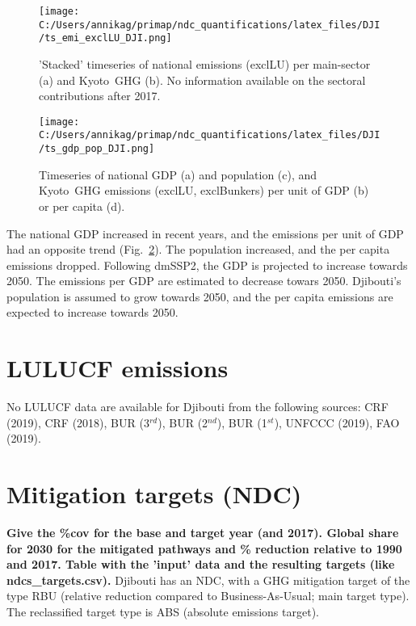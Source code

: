 \documentclass[12pt]{article}
\begin{document}
 \begin{figure}[H]
 \centering
 \texttt{[image: C:/Users/annikag/primap/ndc\_quantifications/latex\_files/DJI/ts\_emi\_exclLU\_DJI.png]}
 \caption{'Stacked' timeseries of national emissions (exclLU) per main-sector (a) and Kyoto~GHG (b). 
 No information available on the sectoral contributions after 2017.}
 \label{fig:tsEmi}
 \end{figure}

 \begin{figure}[H]
 \centering
 \texttt{[image: C:/Users/annikag/primap/ndc\_quantifications/latex\_files/DJI/ts\_gdp\_pop\_DJI.png]}
 \caption{Timeseries of national GDP (a) and population (c), and Kyoto~GHG emissions (exclLU, exclBunkers) per unit of GDP (b) or per capita (d).}
 \label{fig:tsSocioEco}
 \end{figure}

 The national GDP increased in recent years, and the emissions per unit of GDP had an opposite trend (Fig.~\ref{fig:tsSocioEco}).
 The population increased, and the per capita emissions dropped. 
 Following dmSSP2, the GDP is projected to increase towards 2050. 
 The emissions per GDP are estimated to decrease towars 2050. 
 Djibouti's population is assumed to grow towards 2050, and the per capita emissions are expected to increase towards 2050. 

 \newpage %
 \section{LULUCF emissions}
 \label{sec:emiLULUCF}
 No LULUCF data are available for Djibouti from the following sources: CRF (2019), CRF (2018), BUR (3$^{rd}$), BUR (2$^{nd}$), BUR (1$^{st}$), UNFCCC (2019), FAO (2019).

 \newpage %
 \section{Mitigation targets (NDC)}
 \label{sec:mitiTars}

 \textbf{ 
 Give the \%cov for the base and target year (and 2017).
 Global share for 2030 for the mitigated pathways and \% reduction relative to 1990 and 2017.
 Table with the 'input' data and the resulting targets (like ndcs\_targets.csv).}
 Djibouti has an NDC, with a GHG mitigation target of the type RBU (relative reduction compared to Business-As-Usual; main target type).
 The reclassified target type is ABS (absolute emissions target).
\end{document}
